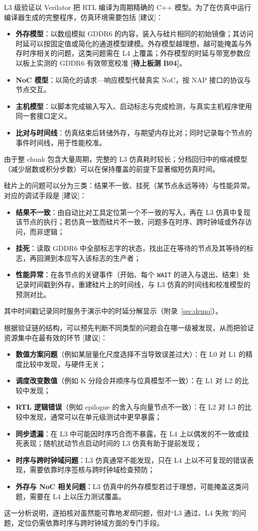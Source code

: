 \documentclass[a4paper,10.5pt]{ctexart}
\newcommand{\tR}{\textsf{[建议]}}           %
\newcommand{\tB}[1]{\textcolor{red!70!black}{\textsf{\textbf{[待上板测 #1]}}}}
\begin{document}
L3 级验证以 Verilator 把 RTL 编译为周期精确的 C++ 模型。为了在仿真中运行编译器生成的完整程序，仿真环境需要包括 \tR：
\begin{itemize}
  \item \textbf{外存模型}：以数组模拟 GDDR6 的内容，装入与硅片相同的初始镜像；其访问时延可以按固定值或简化的通道模型建模。外存模型越理想，越可能掩盖与外存时序相关的问题，这类问题需在 L4 上覆盖；外存模型的时延与带宽参数应以板上实测的 GDDR6 有效带宽校准 \tB{B04}。
  \item \textbf{NoC 模型}：以简化的请求—响应模型代替真实 NoC，按 NAP 接口的协议与节点交互。
  \item \textbf{主机模型}：以脚本完成输入写入、启动标志与完成检测，与真实主机程序使用同一套接口定义。
  \item \textbf{比对与时间线}：仿真结束后转储外存，与期望内存比对；同时记录每个节点的事件时间线，用于性能校准。
\end{itemize}
由于整 chunk 包含大量周期，完整的 L3 仿真耗时较长；分档回归中的缩减模型（减少层数或积分步数）可以在保持覆盖的前提下显著缩短仿真时间。

硅片上的问题可以分为三类：结果不一致、挂死（某节点永远等待）与性能异常。对应的调试手段是 \tR：
\begin{itemize}
  \item \textbf{结果不一致}：由自动比对工具定位第一个不一致的写入，再在 L3 仿真中复现该节点的执行；若仿真一致而硅片不一致，问题多在时序、跨时钟域或外存访问，而非逻辑；
  \item \textbf{挂死}：读取 GDDR6 中全部标志字的状态，找出正在等待的节点及其等待的标志，再回溯到本应写入该标志的生产者；
  \item \textbf{性能异常}：在各节点的关键事件（开始、每个 \texttt{WAIT} 的进入与退出、结束）处记录时间戳到外存，重建硅片上的时间线，与 L3 仿真的时间线和校准模型的预测对比。
\end{itemize}
其中时间戳记录同时服务于演示中的时延分解显示（附录~\ref{sec:demo}）。

根据验证链的结构，可以预先判断不同类型的问题会在哪一级被发现，从而把验证资源集中在最有效的环节 \tR：
\begin{itemize}
  \item \textbf{数值方案问题}（例如某层量化尺度选择不当导致误差过大）：在 L0 对 L1 的精度比较中发现，与硬件无关；
  \item \textbf{调度改变数值}（例如 K 分段合并顺序与位真模型不一致）：在 L1 对 L2 的比较中发现；
  \item \textbf{RTL 逻辑错误}（例如 epilogue 的舍入与向量节点不一致）：在 L2 对 L3 的比较中发现，通常可以在单元级测试中更早暴露；
  \item \textbf{同步遗漏}：在 L3 中可能因时序巧合而不暴露，在 L4 上以偶发的不一致或挂死表现；随机扰动节点启动时间的 L3 仿真有助于提前发现；
  \item \textbf{时序与跨时钟域问题}：L3 仿真通常不能发现，只在 L4 上以不可复现的错误表现，需要依靠时序签核与跨时钟域检查预防；
  \item \textbf{外存与 NoC 相关问题}：L3 仿真中的外存模型若过于理想，可能掩盖这类问题，需要在 L4 上以压力测试覆盖。
\end{itemize}
这一分析说明，逐拍核对虽然能可靠地\emph{发现}问题，但对“L3 通过、L4 失败”的问题，定位仍需依靠时序与跨时钟域方面的专门手段。
\end{document}
